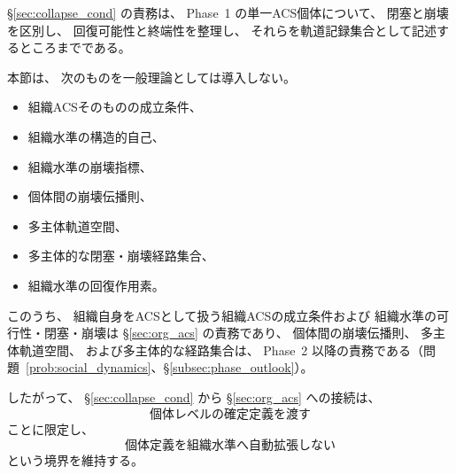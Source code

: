 \begin{remark}[本節の責務境界]
\label{rem:sec7_scope_boundary}
\S\ref{sec:collapse_cond} の責務は、
Phase~1 の単一ACS個体について、
閉塞と崩壊を区別し、
回復可能性と終端性を整理し、
それらを軌道記録集合として記述するところまでである。

本節は、
次のものを一般理論としては導入しない。

\begin{itemize}
  \item
  組織ACSそのものの成立条件、
  \item
  組織水準の構造的自己、
  \item
  組織水準の崩壊指標、
  \item
  個体間の崩壊伝播則、
  \item
  多主体軌道空間、
  \item
  多主体的な閉塞・崩壊経路集合、
  \item
  組織水準の回復作用素。
\end{itemize}

このうち、
組織自身をACSとして扱う組織ACSの成立条件および
組織水準の可行性・閉塞・崩壊は
\S\ref{sec:org_acs} の責務であり、
個体間の崩壊伝播則、
多主体軌道空間、
および多主体的な経路集合は、
Phase~2 以降の責務である（問題~\ref{prob:social_dynamics}、\S\ref{subsec:phase_outlook}）。

したがって、
\S\ref{sec:collapse_cond} から \S\ref{sec:org_acs} への接続は、
\[
  \text{個体レベルの確定定義を渡す}
\]
ことに限定し、
\[
  \text{個体定義を組織水準へ自動拡張しない}
\]
という境界を維持する。
\end{remark}
